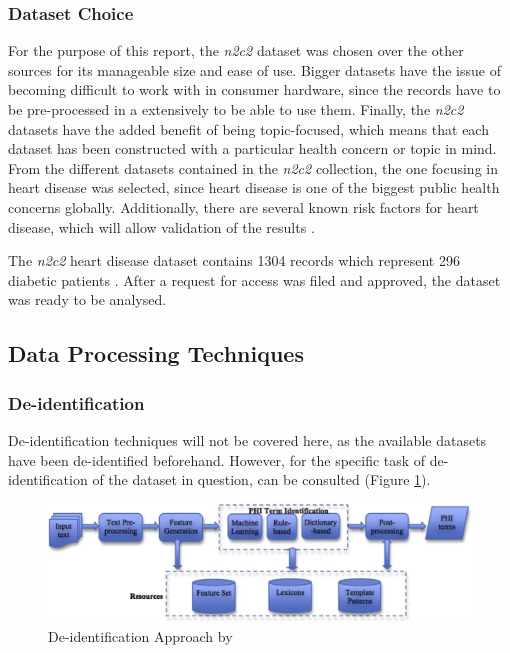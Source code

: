 \documentclass[a4paper,11pt]{article}
\begin{document}
\subsubsection{Dataset Choice}

For the purpose of this report, the \textit{n2c2} dataset was chosen over the
other sources for its manageable size and ease of use.
Bigger datasets have the issue of becoming difficult to work with in consumer hardware,
since the records have to be pre-processed in a extensively to be able to use them.
Finally, the \textit{n2c2} datasets have the added benefit of being topic-focused,
which means that each dataset has been constructed with a particular health concern
or topic in mind.
From the different datasets contained in the \textit{n2c2} collection,
the one focusing in heart disease was selected, since heart disease is one of
the biggest public health concerns globally.
Additionally, there are several known risk factors for heart disease, which will
allow validation of the results \parencite{Kannel2002}.

The \textit{n2c2} heart disease dataset contains 1304 records which represent 296
diabetic patients \parencite{Kumar2015}.
After a request for access was filed and approved, the dataset was ready to be
analysed.


\subsection{Data Processing Techniques}

\subsubsection{De-identification}

De-identification techniques will not be covered here,
as the available datasets have been de-identified beforehand.
However, for the specific task of de-identification of the dataset in question,
\textcite{Yang2015} can be consulted (Figure \ref{fig:deid}).

\begin{figure}[h]
\centering
\scriptsize
\includegraphics{deid}
\caption{De-identification Approach by \textcite{Yang2015}}
\label{fig:deid}
\end{figure}
\end{document}
